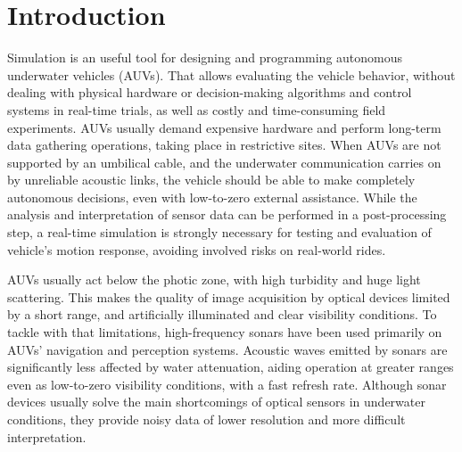 \documentclass[final,5p,times]{elsarticle}
\begin{document}
\linenumbers

\section{Introduction}
\label{introduction}

Simulation is an useful tool for designing and programming autonomous underwater vehicles (AUVs). That allows evaluating the vehicle behavior, without dealing with physical hardware or decision-making algorithms and control systems in real-time trials, as well as costly and time-consuming field experiments. AUVs usually demand expensive hardware and
perform long-term data gathering operations, taking place in restrictive
sites. When AUVs are not supported by an umbilical cable, and the underwater communication carries on by unreliable acoustic links, the vehicle should be able to make completely autonomous decisions, even with low-to-zero external assistance.
While the analysis and interpretation of sensor data can be performed in a
post-processing step, a real-time simulation is strongly necessary for testing
and evaluation of vehicle's motion response, avoiding involved risks on
real-world rides.

AUVs usually act below the photic zone, with high turbidity and huge light
scattering. This makes the quality of image acquisition by optical devices
limited by a short range, and artificially illuminated and clear visibility
conditions. To tackle with that limitations, high-frequency sonars have been used
primarily on AUVs' navigation and perception systems. Acoustic waves emitted
by sonars are significantly less affected by water attenuation,
aiding operation at greater ranges even as low-to-zero visibility conditions,
with a fast refresh rate. Although sonar devices usually solve the main
shortcomings of optical sensors in underwater conditions, they provide noisy data of lower resolution and more difficult interpretation.
\end{document}
